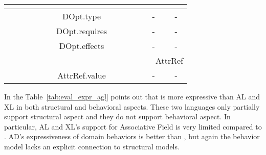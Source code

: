 \begin{minipage}{\textwidth}
\begin{tabular}{|lccc|}
		\multicolumn{4}{|l|}{\cellcolor[HTML]{DAE8FC}{\color[HTML]{333333} \ \ \ \ \ \ \ \ \ \ \ \ \ \ \ \ \ \ \ \ \ \ \ \ \ \ \ \ \ \ \ \ \ \ \ \ DOpt}}                                                                                                                                                                                                                                         \\ \hline
		\multicolumn{1}{|r|}{}                              & \multicolumn{1}{c|}{DOpt.type}                & \multicolumn{1}{c|}{-}                                                                                           & -                                                                                        \\ \hline
		\multicolumn{1}{|r|}{}                              & \multicolumn{1}{c|}{DOpt.requires}            & \multicolumn{1}{c|}{-}                                                                                           & -                                                                                        \\ \hline
		\multicolumn{1}{|r|}{}                              & \multicolumn{1}{c|}{DOpt.effects}             & \multicolumn{1}{c|}{-}                                                                                           & -                                                                                        \\ \hline
		\multicolumn{4}{|l|}{\cellcolor[HTML]{DAE8FC}\ \ \ \ \ \ \ \ \ \ \ \ \ \ \ \ \ \ \ \ \ \ \ \ \ \ \ \ \ \ \ \ \ \ \ \ AttrRef}                                                                                                                                                                                                                                                             \\ \hline
		\multicolumn{1}{|r|}{}                              & \multicolumn{1}{c|}{AttrRef.value}            & \multicolumn{1}{c|}{-}                                                                                           & -                                                                                        \\ \hline
	\end{tabular}
\end{minipage}

	In the Table~\ref{tab:eval_expr_agl} points out that \agldcsl is more expressive than AL and XL in both structural and behavioral aspects. These two languages only partially support structural aspect and they do not support behavioral aspect. In particular, AL and XL's support for Associative Field is very limited compared to \agldcsl. AD's expressiveness of domain behaviors is better than \agl, but again the behavior model lacks an explicit connection to structural models.
	
